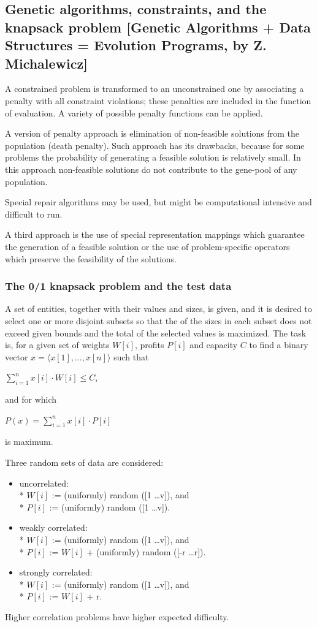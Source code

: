 \documentclass[12pt]{article}
\begin{document}
\subsection{Genetic algorithms, constraints, and the knapsack problem [Genetic Algorithms + Data Structures = Evolution Programs, by Z. Michalewicz]}
A constrained problem is transformed to an unconstrained one by associating a penalty with all constraint violations; these penalties are included in the function of evaluation. A variety of possible penalty functions can be applied.

A version of penalty approach is elimination of non-feasible solutions from the population (death penalty). Such approach has its drawbacks, because for some problems the probability of generating a feasible solution is relatively small. In this approach non-feasible solutions do not contribute to the gene-pool of any population.

Special repair algorithms may be used, but might be computational intensive and difficult to run.

A third approach is the use of special representation mappings which guarantee the generation of a feasible solution or the use of problem-specific operators which preserve the feasibility of the solutions.

\subsubsection{The 0/1 knapsack problem and the test data}
A set of entities, together with their values and sizes, is given, and it is desired to select one or more disjoint subsets so that the of the sizes in each subset does not exceed given bounds and the total of the selected values is maximized. The task is, for a given set of weights $W[i]$, profits $P[i]$ and capacity $C$ to find a binary vector $x = \langle x[1], \dots, x[n]\rangle$ such that
\begin{center}
$\sum_{i = 1}^{n}x[i] \cdot W[i] \le C$,
\end{center}
and for which
\begin{center}
$P(x) = \sum_{i = 1}^{n}x[i] \cdot P[i]$
\end{center}
is maximum.

Three random sets of data are considered:
\begin{itemize}
\item uncorrelated:\\*
$W[i]$ := (uniformly) random ([1 \dots v]), and\\*
$P[i]$ := (uniformly) random ([1 \dots v]).
\item weakly correlated:\\*
$W[i]$ := (uniformly) random ([1 \dots v]), and\\*
$P[i]$ := $W[i]$ + (uniformly) random ([-r \dots r]).
\item strongly correlated:\\*
$W[i]$ := (uniformly) random ([1 \dots v]), and\\*
$P[i]$ := $W[i]$ + r.
\end{itemize}
Higher correlation problems have higher expected difficulty.
\end{document}
